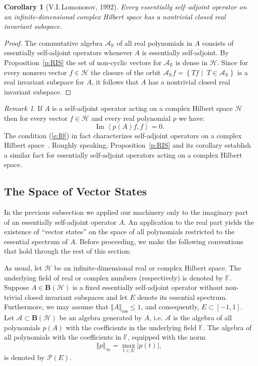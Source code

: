 \documentclass{tran-l}
\newtheorem{cor}[thm]{Corollary}
\theoremstyle{definition}
\theoremstyle{remark}
\newtheorem{rem}[thm]{Remark}
\numberwithin{equation}{subsection}
\DeclareMathOperator{\IM}{Im}
\DeclareMathOperator{\ess}{ess}
\newcommand{\h}{\mathcal{H}}
\newcommand{\A}{\mathcal{A}}
\newcommand{\BH}{\mathbf{B}(\mathcal{H})}
\newcommand{\Real}{\mathbb{R}}
\newcommand{\Field}{\mathbb{F}}
\newcommand{\Poly}{\mathcal{P}(E)}
\newcommand{\abs}[1]{\left\vert#1\right\vert}
\newcommand{\set}[1]{\left\{#1\right\}}
\newcommand{\seq}[1]{\left<#1\right>}
\newcommand{\norm}[1]{\left\Vert#1\right\Vert}
\newcommand{\essnorm}[1]{\norm{#1}_{\ess}}
\begin{document}
\begin{cor}[V.I.\,Lomonosov, 1992]
Every essentially self--adjoint operator on an infinite-dimensional complex Hilbert space has a nontrivial closed real invariant subspace.
\end{cor}

\begin{proof}
The commutative algebra $\A_{\Real}$ of all real polynomials in $A$ consists of essentially self-adjoint operators whenever $A$ is essentially self-adjoint. By Proposition~\ref{p:RIS} the set of non-cyclic vectors for $\A_{\Real}$ is dense in $\h$. Since for every nonzero vector $f\in\h$ the closure of the orbit $\A_{\Real}f=\set{T{f}\,\,|\,\,\,T\in\A_{\Real}}$ is a real invariant subspace for $A$, it follows that $A$ has a nontrivial closed real invariant subspace.
\end{proof}

\begin{rem}
If $A$ is a self-adjoint operator acting on a complex Hilbert space $\h$ then for every vector $f\in\h$ and every real polynomial $p$ we have:
\begin{equation} \label{e:I0}
  \IM\seq{p(A){f},f}=0.
\end{equation}
The condition (\ref{e:I0}) in fact characterizes self-adjoint operators on a complex Hilbert space~\cite[p.~103]{KR83}. Roughly speaking, Proposition~\ref{p:RIS} and its corollary establish a similar fact for essentially self-adjoint operators acting on a complex Hilbert space.
\end{rem}

\subsection{The Space of Vector States}
In the previous subsection we applied our machinery only to the imaginary part of an essentially self-adjoint operator $A$. An application to the real part yields the existence of ``vector states'' on the space of all polynomials restricted to the essential spectrum of $A$. Before proceeding, we make the following conventions that hold through the rest of this section:

As usual, let $\h$ be an infinite-dimensional real or complex Hilbert space. The underlying field of real or complex numbers (respectively) is denoted by $\Field$. Suppose $A\in\BH$ is a fixed essentially self-adjoint operator without non-trivial closed invariant subspaces and let $E$ denote its essential spectrum. Furthermore, we may assume that $\essnorm{A}\leq1$, and consequently, $E\subset[-1,1]$. Let $\A\subset\BH$ be an algebra generated by $A$, i.e. $\A$ is the algebra of all polynomials $p(A)$ with the coefficients in the underlying field $\Field$. The algebra of all polynomials with the coefficients in $\Field$, equipped with the norm
\[ \norm{p}_\infty=\max_{t\in{E}} \abs{p(t)}, \]
is denoted by $\Poly$.
\end{document}
